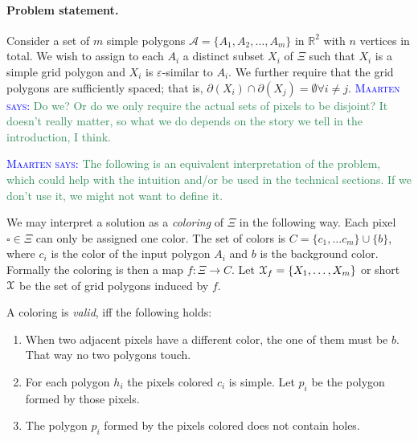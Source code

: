 \documentclass[a4paper, UKenglish]{lipics-v2018}
\newcommand{\mremark}[3]{\textcolor{blue}{\textsc{#1 #2:}} \textcolor{SeaGreen}{\textsf{#3}}}
\newcommand{\maarten}[2][says]{\mremark{Maarten}{#1}{#2}}
\newcommand{\jerome}[2][says]{\mremark{J\'er\^ome}{#1}{#2}}
\newcommand{\pix}{\square}
\newcommand{\eps}{\varepsilon}
\begin{document}
\paragraph {Problem statement.}

Consider a set of $m$ simple polygons $\mathcal{A} = \{A_1, A_2, \ldots, A_m\}$ in $\mathbb{R}^2$ with $n$ vertices in total.
We wish to assign to each $A_i$ a distinct subset $X_i$ of $\Xi$ such that $X_i$ is a simple grid polygon and $X_i$ is $\eps$-similar to $A_i$.
We further require that the grid polygons are sufficiently spaced; that is, $\partial(X_i) \cap \partial(X_j) = \emptyset \forall i \ne j$. \maarten {Do we? Or do we only require the actual sets of pixels to be disjoint? It doesn't really matter, so what we do depends on the story we tell in the introduction, I think.}

\maarten {The following is an equivalent interpretation of the problem, which could help with the intuition and/or be used in the technical sections. If we don't use it, we might not want to define it.}

We may interpret a solution as a {\em coloring} of $\Xi$ in the following way.
Each pixel $\pix\in\Xi$ can only be assigned one color. The set of colors is $C = \{c_1,\dots c_m\}\cup\{b\}$, where $c_i$ is the color of the input polygon $A_i$ and $b$ is the background color.
Formally the coloring is then a map $f:\Xi\to C$.
Let ${\cal X}_f=\{X_1,\dots, X_m\}$ or short ${\cal X}$ be the set of grid polygons induced by $f$.

\begin{definition}
A coloring is \emph{valid}, iff the following holds:
\begin{enumerate}
	\item When two adjacent pixels have a different color, the one of them must be $b$. That way no two polygons touch.
	\item For each polygon $h_i$ the pixels colored $c_i$ is simple. Let $p_i$ be the polygon formed by those pixels.
	\item The polygon $p_i$ formed by the pixels colored does not contain holes.
\end{enumerate}

\end{definition}
\end{document}
